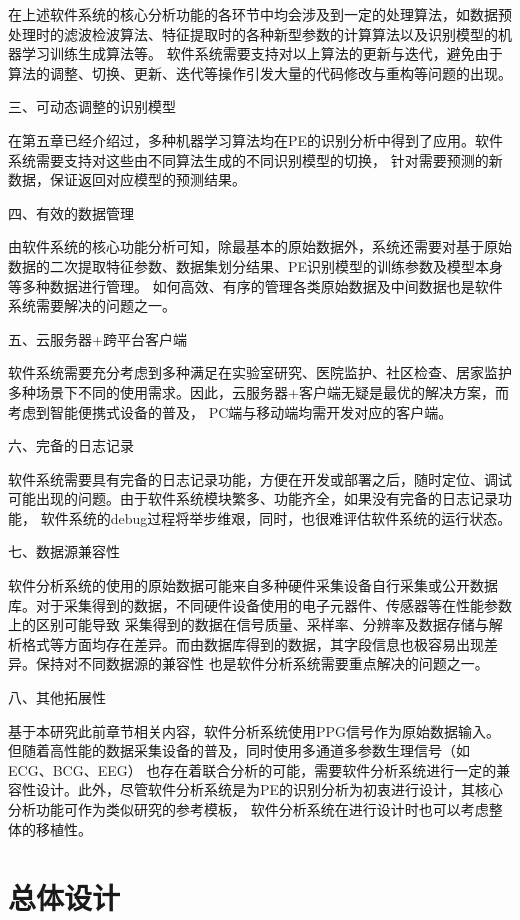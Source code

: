 在上述软件系统的核心分析功能的各环节中均会涉及到一定的处理算法，如数据预处理时的滤波检波算法、特征提取时的各种新型参数的计算算法以及识别模型的机器学习训练生成算法等。
软件系统需要支持对以上算法的更新与迭代，避免由于算法的调整、切换、更新、迭代等操作引发大量的代码修改与重构等问题的出现。

三、可动态调整的识别模型

在第五章已经介绍过，多种机器学习算法均在PE的识别分析中得到了应用。软件系统需要支持对这些由不同算法生成的不同识别模型的切换，
针对需要预测的新数据，保证返回对应模型的预测结果。

四、有效的数据管理

由软件系统的核心功能分析可知，除最基本的原始数据外，系统还需要对基于原始数据的二次提取特征参数、数据集划分结果、PE识别模型的训练参数及模型本身等多种数据进行管理。
如何高效、有序的管理各类原始数据及中间数据也是软件系统需要解决的问题之一。

五、云服务器+跨平台客户端

软件系统需要充分考虑到多种满足在实验室研究、医院监护、社区检查、居家监护多种场景下不同的使用需求。因此，云服务器+客户端无疑是最优的解决方案，而考虑到智能便携式设备的普及，
PC端与移动端均需开发对应的客户端。

六、完备的日志记录

软件系统需要具有完备的日志记录功能，方便在开发或部署之后，随时定位、调试可能出现的问题。由于软件系统模块繁多、功能齐全，如果没有完备的日志记录功能，
软件系统的debug过程将举步维艰，同时，也很难评估软件系统的运行状态。

七、数据源兼容性

软件分析系统的使用的原始数据可能来自多种硬件采集设备自行采集或公开数据库。对于采集得到的数据，不同硬件设备使用的电子元器件、传感器等在性能参数上的区别可能导致
采集得到的数据在信号质量、采样率、分辨率及数据存储与解析格式等方面均存在差异。而由数据库得到的数据，其字段信息也极容易出现差异。保持对不同数据源的兼容性
也是软件分析系统需要重点解决的问题之一。

八、其他拓展性

基于本研究此前章节相关内容，软件分析系统使用PPG信号作为原始数据输入。但随着高性能的数据采集设备的普及，同时使用多通道多参数生理信号（如ECG、BCG、EEG）
也存在着联合分析的可能，需要软件分析系统进行一定的兼容性设计。此外，尽管软件分析系统是为PE的识别分析为初衷进行设计，其核心分析功能可作为类似研究的参考模板，
软件分析系统在进行设计时也可以考虑整体的移植性。

\section{总体设计}

